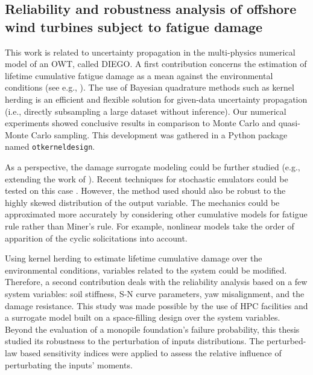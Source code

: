 \subsection*{Reliability and robustness analysis of offshore wind turbines subject to fatigue damage}

This work is related to uncertainty propagation in the multi-physics numerical model of an OWT, called DIEGO. 
A first contribution concerns the estimation of lifetime cumulative fatigue damage as a mean against the environmental conditions (see e.g., \citealp{muller_cheng_2018}). 
The use of Bayesian quadrature methods such as kernel herding \citep{chen_welling_2010,husar_duvenaud_2012} is an efficient and flexible solution for given-data uncertainty propagation (i.e., directly subsampling a large dataset without inference). 
Our numerical experiments showed conclusive results in comparison to Monte Carlo and quasi-Monte Carlo sampling. 
This development was gathered in a Python package named \texttt{otkerneldesign}. 

As a perspective, the damage surrogate modeling could be further studied (e.g., extending the work of \citealp{slot_sorensen_2020}). 
Recent techniques for stochastic emulators could be tested on this case \citep{baker_2022_stochastic_surrogates_review,zhu_2023_stochastic_pce,luthen_2023_stochastic_pce}.
However, the method used should also be robust to the highly skewed distribution of the output variable. 
The mechanics could be approximated more accurately by considering other cumulative models for fatigue rule rather than Miner's rule. 
For example, nonlinear models \citep{rocher_2020_nonlinear_fatigue} take the order of apparition of the cyclic solicitations into account.  

Using kernel herding to estimate lifetime cumulative damage over the environmental conditions, variables related to the system could be modified. 
Therefore, a second contribution deals with the reliability analysis based on a few system variables: soil stiffness, S-N curve parameters, yaw misalignment, and the damage resistance.   
This study was made possible by the use of HPC facilities and a surrogate model built on a space-filling design over the system variables. 
Beyond the evaluation of a monopile foundation's failure probability, this thesis studied its robustness to the perturbation of inputs distributions.  
The perturbed-law based sensitivity indices \citep{lemaitre_2015_PLI} were applied to assess the relative influence of perturbating the inputs' moments. 

